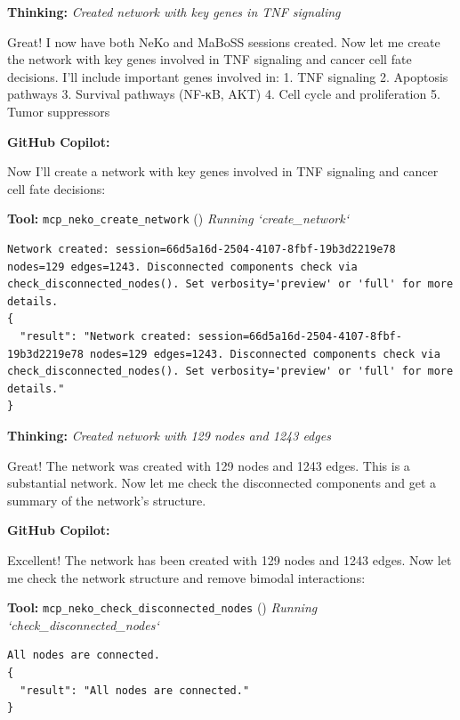 \documentclass[11pt,a4paper]{article}
\begin{document}
\begin{thinkbox}
\textbf{Thinking:} \textit{Created network with key genes in TNF signaling}

Great! I now have both NeKo and MaBoSS sessions created. Now let me create the network with key genes involved in TNF signaling and cancer cell fate decisions. I'll include important genes involved in:
1. TNF signaling
2. Apoptosis pathways
3. Survival pathways (NF-κB, AKT)
4. Cell cycle and proliferation
5. Tumor suppressors

\end{thinkbox}
\begin{copilotbox}
\textbf{GitHub Copilot:}

Now I'll create a network with key genes involved in TNF signaling and cancer cell fate decisions:

\end{copilotbox}
\begin{toolokbox}
\textbf{Tool:} \texttt{mcp\_neko\_create\_network} (\checkmark)
\textit{Running `create\_network`}
\begin{lstlisting}
Network created: session=66d5a16d-2504-4107-8fbf-19b3d2219e78 nodes=129 edges=1243. Disconnected components check via check_disconnected_nodes(). Set verbosity='preview' or 'full' for more details.
{
  "result": "Network created: session=66d5a16d-2504-4107-8fbf-19b3d2219e78 nodes=129 edges=1243. Disconnected components check via check_disconnected_nodes(). Set verbosity='preview' or 'full' for more details."
}
\end{lstlisting}
\end{toolokbox}
\begin{thinkbox}
\textbf{Thinking:} \textit{Created network with 129 nodes and 1243 edges}

Great! The network was created with 129 nodes and 1243 edges. This is a substantial network. Now let me check the disconnected components and get a summary of the network's structure.

\end{thinkbox}
\begin{copilotbox}
\textbf{GitHub Copilot:}

Excellent! The network has been created with 129 nodes and 1243 edges. Now let me check the network structure and remove bimodal interactions:

\end{copilotbox}
\begin{toolokbox}
\textbf{Tool:} \texttt{mcp\_neko\_check\_disconnected\_nodes} (\checkmark)
\textit{Running `check\_disconnected\_nodes`}
\begin{lstlisting}
All nodes are connected.
{
  "result": "All nodes are connected."
}
\end{lstlisting}
\end{toolokbox}
\end{document}

